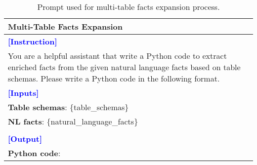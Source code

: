 \begin{table*}[htbp]
\centering
\begin{tabularx}{\textwidth}{X}
\toprule
\textbf{Multi-Table Facts Expansion} \\ \midrule
\textcolor{blue}{\textbf{[Instruction]}} \\
You are a helpful assistant that write a Python code to extract enriched facts from the given natural language facts based on table schemas. Please write a Python code in the following format. \\



\textcolor{blue}{\textbf{[Inputs]}} \\
\textbf{Table schemas}: \{table\_schemas\} \\
\textbf{NL facts}: \{natural\_language\_facts\} \\\\
\textcolor{blue}{\textbf{[Output]}} \\
\textbf{Python code}: \\ \bottomrule
\end{tabularx}
\caption{Prompt used for multi-table facts expansion process.}
\label{pmt:step3_1}
\end{table*}